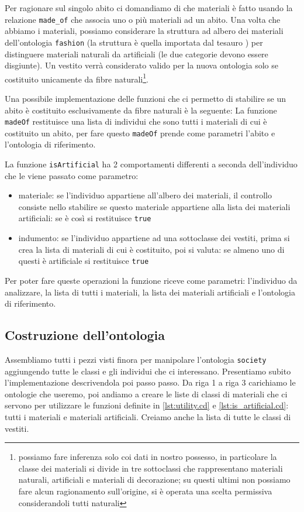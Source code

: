 Per ragionare sul singolo abito ci domandiamo di che materiali è fatto usando la relazione \verb|made_of| che associa uno o più materiali ad un abito. Una volta che abbiamo i materiali, possiamo considerare la struttura ad albero dei materiali dell'ontologia \verb|fashion| (la struttura è quella importata dal tesauro ) per distinguere materiali naturali da artificiali (le due categorie devono essere disgiunte). Un vestito verrà considerato valido per la nuova ontologia solo se costituito unicamente da fibre naturali\footnote{possiamo fare inferenza solo coi dati in nostro possesso, in particolare la classe dei materiali si divide in tre sottoclassi che rappresentano materiali naturali, artificiali e materiali di decorazione; su questi ultimi non possiamo fare alcun ragionamento sull'origine, si è operata una scelta permissiva considerandoli tutti naturali}.

Una possibile implementazione delle funzioni che ci permetto di stabilire se un abito è costituito esclusivamente da fibre naturali è la seguente:
La funzione \verb|madeOf| restituisce una lista di individui che sono tutti i materiali di cui è costituito un abito, per fare questo \verb|madeOf| prende come parametri l'abito e l'ontologia di riferimento. 

La funzione \verb|isArtificial| ha 2 comportamenti differenti a seconda dell'individuo che le viene passato come parametro:
\begin{itemize}
	\item materiale: se l'individuo appartiene all'albero dei materiali, il controllo consiste nello stabilire se questo materiale appartiene alla lista dei materiali artificiali: se è così si restituisce \verb|true|
	\item indumento: se l'individuo appartiene ad una sottoclasse dei vestiti, prima si crea la lista di materiali di cui è costituito, poi si valuta: se almeno uno di questi è artificiale si restituisce \verb|true|
\end{itemize}
Per poter fare queste operazioni la funzione riceve come parametri: l'individuo da analizzare, la lista di tutti i materiali, la lista dei materiali artificiali e  l'ontologia di riferimento.
\subsection{Costruzione dell'ontologia}
Assembliamo tutti i pezzi visti finora per manipolare l'ontologia \verb|society| aggiungendo tutte le classi e gli individui che ci interessano. Presentiamo subito l'implementazione descrivendola poi passo passo.
Da riga 1 a riga 3 carichiamo le ontologie che useremo, poi andiamo a creare le liste di classi di materiali che ci servono per utilizzare le funzioni definite in \ref{lst:utility.cd} e \ref{lst:is_artificial.cd}: tutti i materiali e materiali artificiali. Creiamo anche la lista di tutte le classi di vestiti.

